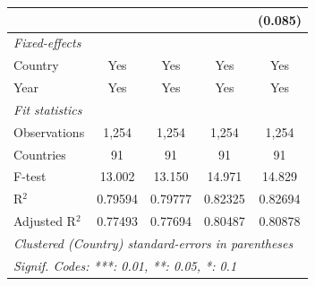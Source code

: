 \begin{table}[H]
\begin{tabular}{lcccc}
                                                                     &              &               &               & (0.085)\\   
      \midrule
      \emph{Fixed-effects}\\
      Country                                                        & Yes          & Yes           & Yes           & Yes\\  
      Year                                                           & Yes          & Yes           & Yes           & Yes\\  
      \midrule
      \emph{Fit statistics}\\
      Observations                                                   & 1,254        & 1,254         & 1,254         & 1,254\\  
      Countries                                                      & 91           & 91            & 91            & 91\\  
      F-test                                                         & 13.002       & 13.150        & 14.971        & 14.829\\  
      R$^2$                                                          & 0.79594      & 0.79777       & 0.82325       & 0.82694\\  
      Adjusted R$^2$                                                 & 0.77493      & 0.77694       & 0.80487       & 0.80878\\  
      \midrule \midrule
      \multicolumn{5}{l}{\emph{Clustered (Country) standard-errors in parentheses}}\\
      \multicolumn{5}{l}{\emph{Signif. Codes: ***: 0.01, **: 0.05, *: 0.1}}\\
   \end{tabular}
\end{table}



